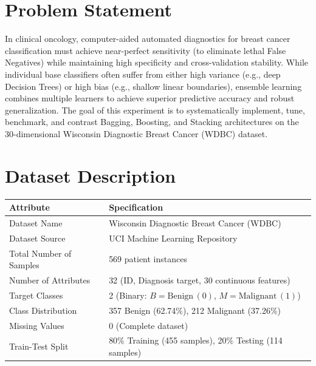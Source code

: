 \documentclass[12pt,a4paper]{article}
\begin{document}
\section{Problem Statement}
In clinical oncology, computer-aided automated diagnostics for breast cancer classification must achieve near-perfect sensitivity (to eliminate lethal False Negatives) while maintaining high specificity and cross-validation stability. While individual base classifiers often suffer from either high variance (e.g., deep Decision Trees) or high bias (e.g., shallow linear boundaries), ensemble learning combines multiple learners to achieve superior predictive accuracy and robust generalization. The goal of this experiment is to systematically implement, tune, benchmark, and contrast Bagging, Boosting, and Stacking architectures on the 30-dimensional Wisconsin Diagnostic Breast Cancer (WDBC) dataset.

\section{Dataset Description}
\begin{longtable}{|p{5.5cm}|p{8.5cm}|}
\hline
\textbf{Attribute} & \textbf{Specification} \\ \hline
\endhead
Dataset Name & Wisconsin Diagnostic Breast Cancer (WDBC) \\ \hline
Dataset Source & UCI Machine Learning Repository \\ \hline
Total Number of Samples & 569 patient instances \\ \hline
Number of Attributes & 32 (ID, Diagnosis target, 30 continuous features) \\ \hline
Target Classes & 2 (Binary: $B = \text{Benign} \, (0)$, $M = \text{Malignant} \, (1)$) \\ \hline
Class Distribution & 357 Benign (62.74\%), 212 Malignant (37.26\%) \\ \hline
Missing Values & 0 (Complete dataset) \\ \hline
Train-Test Split & 80\% Training (455 samples), 20\% Testing (114 samples) \\ \hline
\end{longtable}
\end{document}
